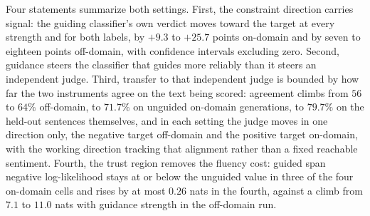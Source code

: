 Four statements summarize both settings. First, the constraint direction carries signal: the guiding classifier's own verdict moves toward the target at every strength and for both labels, by $+9.3$ to $+25.7$ points on-domain and by seven to eighteen points off-domain, with confidence intervals excluding zero.
Second, guidance steers the classifier that guides more reliably than it steers an independent judge. Third, transfer to that independent judge is bounded by how far the two instruments agree on the text being scored: agreement climbs from $56$ to $64\%$ off-domain, to $71.7\%$ on unguided on-domain generations, to $79.7\%$ on the held-out sentences themselves, and in each setting the judge moves in one direction only, the negative target off-domain and the positive target on-domain, with the working direction tracking that alignment rather than a fixed reachable sentiment.
Fourth, the trust region removes the fluency cost: guided span negative log-likelihood stays at or below the unguided value in three of the four on-domain cells and rises by at most $0.26$ nats in the fourth, against a climb from $7.1$ to $11.0$ nats with guidance strength in the off-domain run.

